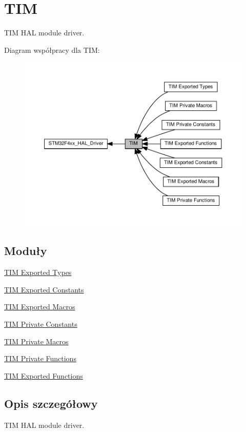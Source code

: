 \hypertarget{group___t_i_m}{}\section{T\+IM}
\label{group___t_i_m}


T\+IM H\+AL module driver.  


Diagram współpracy dla T\+IM\+:\nopagebreak
\begin{figure}[H]
\begin{center}
\leavevmode
\includegraphics[width=350pt]{group___t_i_m}
\end{center}
\end{figure}
\subsection*{Moduły}
\begin{DoxyCompactItemize}
\item 
\hyperlink{group___t_i_m___exported___types}{T\+I\+M Exported Types}
\item 
\hyperlink{group___t_i_m___exported___constants}{T\+I\+M Exported Constants}
\item 
\hyperlink{group___t_i_m___exported___macros}{T\+I\+M Exported Macros}
\item 
\hyperlink{group___t_i_m___private___constants}{T\+I\+M Private Constants}
\item 
\hyperlink{group___t_i_m___private___macros}{T\+I\+M Private Macros}
\item 
\hyperlink{group___t_i_m___private___functions}{T\+I\+M Private Functions}
\item 
\hyperlink{group___t_i_m___exported___functions}{T\+I\+M Exported Functions}
\end{DoxyCompactItemize}


\subsection{Opis szczegółowy}
T\+IM H\+AL module driver. 

